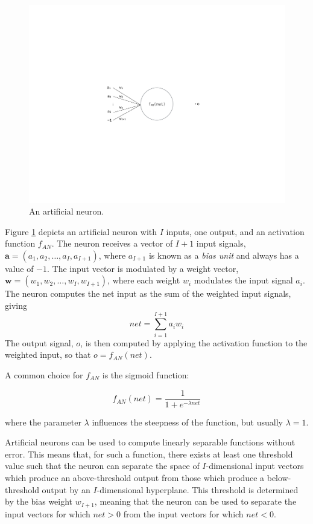 \documentclass[master]{outhesis}
\begin{document}
\begin{figure}[H]
	\centering
	\includegraphics{ArtificialNeuron.pdf}
	\caption{An artificial neuron.}
	\label{fig:neuron}
\end{figure}

Figure \ref{fig:neuron} depicts an artificial neuron with $I$ inputs, one output, and an activation function $f_{AN}$. The neuron receives a vector of $I+1$ input signals, $\mathbf{a}=(a_1, a_2, \ldots, a_I, a_{I+1})$, where $a_{I+1}$ is known as a \emph{bias unit} and always has a value of $-1$.  The input vector is modulated by a weight vector, $\mathbf{w}=(w_1, w_2, \ldots, w_I, w_{I+1})$, where each weight $w_i$ modulates the input signal $a_i$. The neuron computes the net input as the sum of the weighted input signals, giving
\begin{equation}
net=\sum_{i=1}^{I+1}a_iw_i
\end{equation}
The output signal, $o$, is then computed by applying the activation function to the weighted input, so that $o=f_{AN}(net)$.

A common choice for $f_{AN}$ is the sigmoid function:

\begin{equation}
f_{AN}(net) = \frac{1}{1 + e^{-\lambda net}}
\end{equation}

where the parameter $\lambda$ influences the steepness of the function, but usually $\lambda = 1$.

Artificial neurons can be used to compute linearly separable functions without error. This means that, for such a function, there exists at least one threshold value such that the neuron can separate the space of $I$-dimensional input vectors which produce an above-threshold output from those which produce a below-threshold output by an $I$-dimensional hyperplane. This threshold is determined by the bias weight $w_{I+1}$, meaning that the neuron can be used to separate the input vectors for which $net > 0$ from the input vectors for which $net < 0$.
\end{document}
